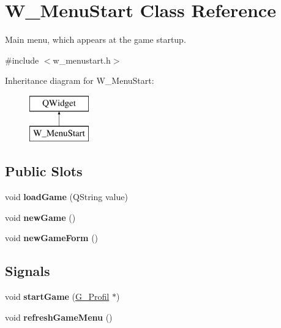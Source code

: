 \hypertarget{class_w___menu_start}{}\section{W\+\_\+\+Menu\+Start Class Reference}
\label{class_w___menu_start}


Main menu, which appears at the game startup.  




{\ttfamily \#include $<$w\+\_\+menustart.\+h$>$}

Inheritance diagram for W\+\_\+\+Menu\+Start\+:\begin{figure}[H]
\begin{center}
\leavevmode
\includegraphics[height=2.000000cm]{class_w___menu_start}
\end{center}
\end{figure}
\subsection*{Public Slots}
\begin{DoxyCompactItemize}
\item 
\hypertarget{class_w___menu_start_aca05c93827e90a48e5044846e0a76f23}{}void {\bfseries load\+Game} (Q\+String value)\label{class_w___menu_start_aca05c93827e90a48e5044846e0a76f23}

\item 
\hypertarget{class_w___menu_start_a5dbc5260b96e79bdd2a55c54095f9853}{}void {\bfseries new\+Game} ()\label{class_w___menu_start_a5dbc5260b96e79bdd2a55c54095f9853}

\item 
\hypertarget{class_w___menu_start_aff79d990b8166fe640fad052d7271a30}{}void {\bfseries new\+Game\+Form} ()\label{class_w___menu_start_aff79d990b8166fe640fad052d7271a30}

\end{DoxyCompactItemize}
\subsection*{Signals}
\begin{DoxyCompactItemize}
\item 
\hypertarget{class_w___menu_start_a21cf2c3cc2f360daa9d46f1b5c983461}{}void {\bfseries start\+Game} (\hyperlink{class_g___profil}{G\+\_\+\+Profil} $\ast$)\label{class_w___menu_start_a21cf2c3cc2f360daa9d46f1b5c983461}

\item 
\hypertarget{class_w___menu_start_a5e5f50ca83e56da21da0df7cc6bfd8f1}{}void {\bfseries refresh\+Game\+Menu} ()\label{class_w___menu_start_a5e5f50ca83e56da21da0df7cc6bfd8f1}

\end{DoxyCompactItemize}
